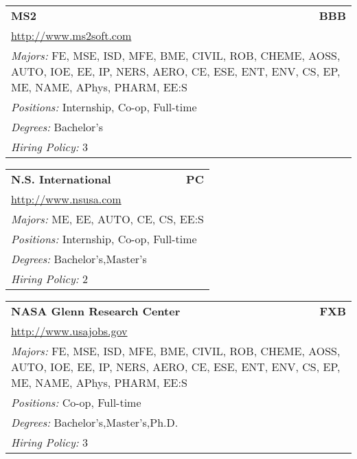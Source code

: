 \documentclass[twoside]{article}
\begin{document}
\begin{center}
\begin{multicols}{3}
\begin{FlushLeft}
\begin{minipage}{\columnwidth}\begin{tabularx}{.95\columnwidth}{Xr}
                 {\Large\bf MS2} & {\Large\bf BBB}\\
    \multicolumn{2}{p{.95\columnwidth}}{\url{http://www.ms2soft.com}}\\
    \multicolumn{2}{p{.95\columnwidth}}{\emph{Majors:} FE, MSE, ISD, MFE, BME, CIVIL, ROB, CHEME, AOSS, AUTO, IOE, EE, IP, NERS, AERO, CE, ESE, ENT, ENV, CS, EP, ME, NAME, APhys, PHARM, EE:S}\\
    \multicolumn{2}{p{.95\columnwidth}}{\emph{Positions:} Internship, Co-op, Full-time}\\
    \multicolumn{2}{p{.95\columnwidth}}{\emph{Degrees:} Bachelor's}\\
    \multicolumn{2}{p{.95\columnwidth}}{\emph{Hiring Policy:} 3}\\
    \end{tabularx}
    
\end{minipage}
 
\begin{minipage}{\columnwidth}\begin{tabularx}{.95\columnwidth}{Xr}
                 {\Large\bf N.S. International} & {\Large\bf PC}\\
    \multicolumn{2}{p{.95\columnwidth}}{\url{http://www.nsusa.com}}\\
    \multicolumn{2}{p{.95\columnwidth}}{\emph{Majors:} ME, EE, AUTO, CE, CS, EE:S}\\
    \multicolumn{2}{p{.95\columnwidth}}{\emph{Positions:} Internship, Co-op, Full-time}\\
    \multicolumn{2}{p{.95\columnwidth}}{\emph{Degrees:} Bachelor's,Master's}\\
    \multicolumn{2}{p{.95\columnwidth}}{\emph{Hiring Policy:} 2}\\
    \end{tabularx}
    
\end{minipage}
 
\begin{minipage}{\columnwidth}\begin{tabularx}{.95\columnwidth}{Xr}
                 {\Large\bf NASA Glenn Research Center} & {\Large\bf FXB}\\
    \multicolumn{2}{p{.95\columnwidth}}{\url{http://www.usajobs.gov}}\\
    \multicolumn{2}{p{.95\columnwidth}}{\emph{Majors:} FE, MSE, ISD, MFE, BME, CIVIL, ROB, CHEME, AOSS, AUTO, IOE, EE, IP, NERS, AERO, CE, ESE, ENT, ENV, CS, EP, ME, NAME, APhys, PHARM, EE:S}\\
    \multicolumn{2}{p{.95\columnwidth}}{\emph{Positions:} Co-op, Full-time}\\
    \multicolumn{2}{p{.95\columnwidth}}{\emph{Degrees:} Bachelor's,Master's,Ph.D.}\\
    \multicolumn{2}{p{.95\columnwidth}}{\emph{Hiring Policy:} 3}\\
    \end{tabularx}
    

\end{minipage}
\end{FlushLeft}
\end{multicols}
\end{center}
\end{document}
